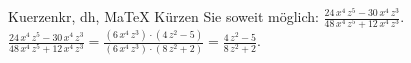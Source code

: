 \begin{MAufgabe}{Kuerzen}{kr, dh, MaTeX}
K\"urzen Sie soweit m\"oglich: $\frac{24\, x^4\, z^5 - 30\, x^4\, z^3}{48\, x^4\, z^5 + 12\, x^4\, z^3}$.\\ 
\ifLsg\MLoesung
\quad $\frac{24\, x^4\, z^5 - 30\, x^4\, z^3}{48\, x^4\, z^5 + 12\, x^4\, z^3}=\frac{(6\, x^4\, z^3)\cdot(4\, z^2 - 5)}{(6\, x^4\, z^3)\cdot(8\, z^2 + 2)}=\frac{4\, z^2 - 5}{8\, z^2 + 2}$.\else\relax\fi
 \end{MAufgabe}
